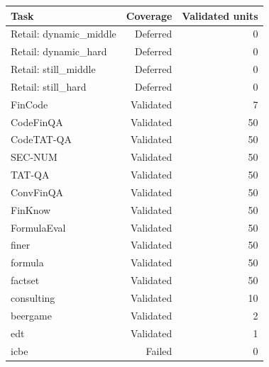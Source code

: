 \begin{tabular}{lrr}
\toprule
Task & Coverage & Validated units \\
\midrule
Retail: dynamic\_middle & Deferred & 0 \\
Retail: dynamic\_hard & Deferred & 0 \\
Retail: still\_middle & Deferred & 0 \\
Retail: still\_hard & Deferred & 0 \\
FinCode & Validated & 7 \\
CodeFinQA & Validated & 50 \\
CodeTAT-QA & Validated & 50 \\
SEC-NUM & Validated & 50 \\
TAT-QA & Validated & 50 \\
ConvFinQA & Validated & 50 \\
FinKnow & Validated & 50 \\
FormulaEval & Validated & 50 \\
finer & Validated & 50 \\
formula & Validated & 50 \\
factset & Validated & 50 \\
consulting & Validated & 10 \\
beergame & Validated & 2 \\
edt & Validated & 1 \\
icbe & Failed & 0 \\
\bottomrule
\end{tabular}
